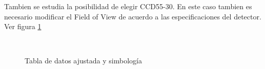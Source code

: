 \documentclass[a4paper,10pt]{article}
\begin{document}
Tambien se estudia la posibilidad de elegir CCD55-30. En este caso tambien es necesario modificar el Field of View de acuerdo a las especificaciones del detector.
Ver figura \ref{fig:ccd50p2}
\begin{figure}[ht!]
  \centering
  ~ 
  ~ 
  \caption{Tabla de datos ajustada y simbología}
  \label{fig:ccd50p2}
\end{figure}
\end{document}

